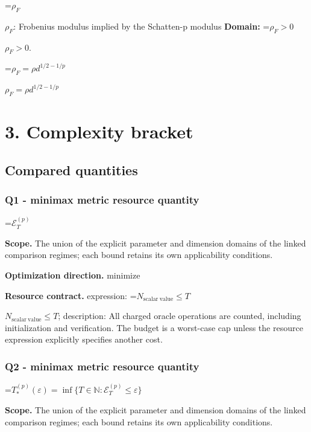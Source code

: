 \documentclass[10pt,a4paper]{article}
\newcommand{\AtlasMath}[1]{\par\begingroup\centering\setbox0=\hbox{$\displaystyle #1$}\ifdim\wd0>1.4\linewidth\typeout{ATLAS WIDE FORMULA: \the\wd0}\fi\ifdim\wd0>\linewidth\resizebox{\linewidth}{!}{\box0}\else\box0\fi\par\endgroup}
\newcommand{\AtlasInlineMath}[1]{\begingroup\setbox0=\hbox{$#1$}\ifdim\wd0>.4\linewidth\endgroup\AtlasMath{#1}\else\endgroup$#1$\fi}
\begin{document}
\AtlasInlineMath{\rho_F}: Frobenius modulus implied by the Schatten-p modulus \textbf{Domain:} \AtlasInlineMath{\rho_F>0}.



\AtlasInlineMath{\rho_F=\rho d^{1/2-1/p}}



\section{3. Complexity bracket}


\subsection{Compared quantities}


\subsubsection{Q1 - minimax metric resource quantity}


\AtlasMath{\mathcal E_T^{(p)}}


\textbf{Scope.} The union of the explicit parameter and dimension domains of the linked comparison regimes; each bound retains its own applicability conditions.



\textbf{Optimization direction.} minimize



\textbf{Resource contract.} expression: \AtlasInlineMath{N_{\mathrm{scalar\ value}}\le T}; description: All charged oracle operations are counted, including initialization and verification. The budget is a worst-case cap unless the resource expression explicitly specifies another cost.



\subsubsection{Q2 - minimax metric resource quantity}


\AtlasMath{T_*^{(p)}(\varepsilon)=\inf\{T\in\mathbb N:\mathcal E_T^{(p)}\le\varepsilon\}}


\textbf{Scope.} The union of the explicit parameter and dimension domains of the linked comparison regimes; each bound retains its own applicability conditions.
\end{document}
